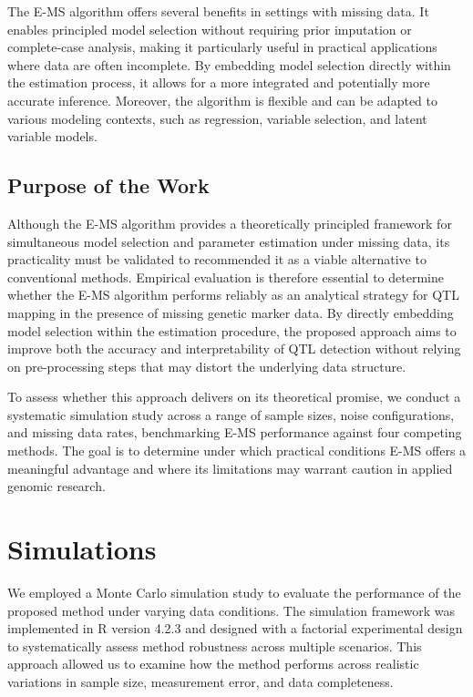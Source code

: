 \documentclass[
  12pt,
]{article}
\begin{document}
The E-MS algorithm offers several benefits in settings with missing
data. It enables principled model selection without requiring prior
imputation or complete-case analysis, making it particularly useful in
practical applications where data are often incomplete. By embedding
model selection directly within the estimation process, it allows for a
more integrated and potentially more accurate inference. Moreover, the
algorithm is flexible and can be adapted to various modeling contexts,
such as regression, variable selection, and latent variable models.

\subsection{Purpose of the Work}

Although the E-MS algorithm provides a theoretically principled framework for simultaneous model selection and parameter estimation under missing data, its practicality must be validated to recommended it as a viable alternative to conventional methods. 
Empirical evaluation is therefore essential to determine whether the E-MS algorithm performs reliably as an analytical strategy for QTL mapping in the presence of missing genetic marker data. 
By directly embedding model selection within the estimation procedure, the proposed approach aims to improve both the accuracy and interpretability of QTL detection without relying on pre-processing steps that may distort the underlying data structure.

To assess whether this approach delivers on its theoretical promise, we conduct a systematic simulation study across a range of sample sizes, noise configurations, and missing data rates, benchmarking E-MS performance against four competing methods. 
The goal is to determine under which practical conditions E-MS offers a meaningful advantage and where its limitations may warrant caution in applied genomic research.

\section{Simulations}


We employed a Monte Carlo simulation study to evaluate the performance
of the proposed method under varying data conditions. The simulation
framework was implemented in R version 4.2.3 and designed with a
factorial experimental design to systematically assess method robustness
across multiple scenarios. This approach allowed us to examine how the
method performs across realistic variations in sample size, measurement
error, and data completeness.
\end{document}
